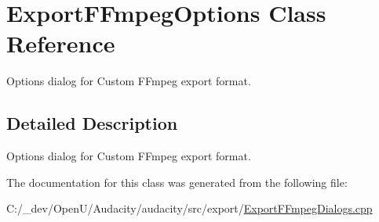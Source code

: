\hypertarget{class_export_f_fmpeg_options}{}\section{Export\+F\+Fmpeg\+Options Class Reference}
\label{class_export_f_fmpeg_options}


Options dialog for Custom F\+Fmpeg export format.  




\subsection{Detailed Description}
Options dialog for Custom F\+Fmpeg export format. 

The documentation for this class was generated from the following file\+:\begin{DoxyCompactItemize}
\item 
C\+:/\+\_\+dev/\+Open\+U/\+Audacity/audacity/src/export/\hyperlink{_export_f_fmpeg_dialogs_8cpp}{Export\+F\+Fmpeg\+Dialogs.\+cpp}\end{DoxyCompactItemize}
